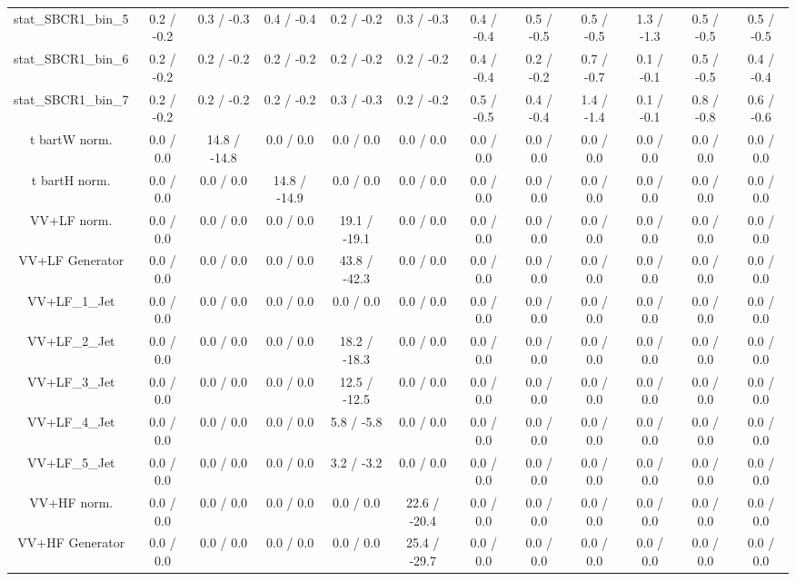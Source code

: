 \begin{table}[htbp]
\begin{center}
\begin{tabular}{|c|c|c|c|c|c|c|c|c|c|c|c|}
 stat_SBCR1_bin_5 & 0.2 / -0.2 & 0.3 / -0.3 & 0.4 / -0.4 & 0.2 / -0.2 & 0.3 / -0.3 & 0.4 / -0.4 & 0.5 / -0.5 & 0.5 / -0.5 & 1.3 / -1.3 & 0.5 / -0.5 & 0.5 / -0.5 \\ 
 stat_SBCR1_bin_6 & 0.2 / -0.2 & 0.2 / -0.2 & 0.2 / -0.2 & 0.2 / -0.2 & 0.2 / -0.2 & 0.4 / -0.4 & 0.2 / -0.2 & 0.7 / -0.7 & 0.1 / -0.1 & 0.5 / -0.5 & 0.4 / -0.4 \\ 
 stat_SBCR1_bin_7 & 0.2 / -0.2 & 0.2 / -0.2 & 0.2 / -0.2 & 0.3 / -0.3 & 0.2 / -0.2 & 0.5 / -0.5 & 0.4 / -0.4 & 1.4 / -1.4 & 0.1 / -0.1 & 0.8 / -0.8 & 0.6 / -0.6 \\ 
  t bar{t}W norm. & 0.0 / 0.0 & 14.8 / -14.8 & 0.0 / 0.0 & 0.0 / 0.0 & 0.0 / 0.0 & 0.0 / 0.0 & 0.0 / 0.0 & 0.0 / 0.0 & 0.0 / 0.0 & 0.0 / 0.0 & 0.0 / 0.0 \\ 
  t bar{t}H norm. & 0.0 / 0.0 & 0.0 / 0.0 & 14.8 / -14.9 & 0.0 / 0.0 & 0.0 / 0.0 & 0.0 / 0.0 & 0.0 / 0.0 & 0.0 / 0.0 & 0.0 / 0.0 & 0.0 / 0.0 & 0.0 / 0.0 \\ 
  VV+LF norm. & 0.0 / 0.0 & 0.0 / 0.0 & 0.0 / 0.0 & 19.1 / -19.1 & 0.0 / 0.0 & 0.0 / 0.0 & 0.0 / 0.0 & 0.0 / 0.0 & 0.0 / 0.0 & 0.0 / 0.0 & 0.0 / 0.0 \\ 
  VV+LF Generator & 0.0 / 0.0 & 0.0 / 0.0 & 0.0 / 0.0 & 43.8 / -42.3 & 0.0 / 0.0 & 0.0 / 0.0 & 0.0 / 0.0 & 0.0 / 0.0 & 0.0 / 0.0 & 0.0 / 0.0 & 0.0 / 0.0 \\ 
  VV+LF_1_Jet & 0.0 / 0.0 & 0.0 / 0.0 & 0.0 / 0.0 & 0.0 / 0.0 & 0.0 / 0.0 & 0.0 / 0.0 & 0.0 / 0.0 & 0.0 / 0.0 & 0.0 / 0.0 & 0.0 / 0.0 & 0.0 / 0.0 \\ 
  VV+LF_2_Jet & 0.0 / 0.0 & 0.0 / 0.0 & 0.0 / 0.0 & 18.2 / -18.3 & 0.0 / 0.0 & 0.0 / 0.0 & 0.0 / 0.0 & 0.0 / 0.0 & 0.0 / 0.0 & 0.0 / 0.0 & 0.0 / 0.0 \\ 
  VV+LF_3_Jet & 0.0 / 0.0 & 0.0 / 0.0 & 0.0 / 0.0 & 12.5 / -12.5 & 0.0 / 0.0 & 0.0 / 0.0 & 0.0 / 0.0 & 0.0 / 0.0 & 0.0 / 0.0 & 0.0 / 0.0 & 0.0 / 0.0 \\ 
  VV+LF_4_Jet & 0.0 / 0.0 & 0.0 / 0.0 & 0.0 / 0.0 & 5.8 / -5.8 & 0.0 / 0.0 & 0.0 / 0.0 & 0.0 / 0.0 & 0.0 / 0.0 & 0.0 / 0.0 & 0.0 / 0.0 & 0.0 / 0.0 \\ 
  VV+LF_5_Jet & 0.0 / 0.0 & 0.0 / 0.0 & 0.0 / 0.0 & 3.2 / -3.2 & 0.0 / 0.0 & 0.0 / 0.0 & 0.0 / 0.0 & 0.0 / 0.0 & 0.0 / 0.0 & 0.0 / 0.0 & 0.0 / 0.0 \\ 
  VV+HF norm. & 0.0 / 0.0 & 0.0 / 0.0 & 0.0 / 0.0 & 0.0 / 0.0 & 22.6 / -20.4 & 0.0 / 0.0 & 0.0 / 0.0 & 0.0 / 0.0 & 0.0 / 0.0 & 0.0 / 0.0 & 0.0 / 0.0 \\ 
  VV+HF Generator & 0.0 / 0.0 & 0.0 / 0.0 & 0.0 / 0.0 & 0.0 / 0.0 & 25.4 / -29.7 & 0.0 / 0.0 & 0.0 / 0.0 & 0.0 / 0.0 & 0.0 / 0.0 & 0.0 / 0.0 & 0.0 / 0.0 \\ 

\end{tabular}
\end{center}
\end{table}
